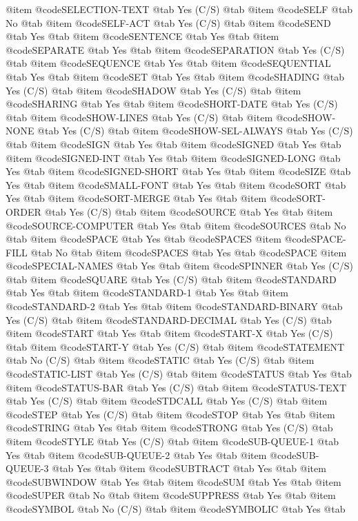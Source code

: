 @item @code{SELECTION-TEXT} @tab Yes	(C/S) @tab 
@item @code{SELF} @tab No @tab 
@item @code{SELF-ACT} @tab Yes	(C/S) @tab 
@item @code{SEND} @tab Yes @tab 
@item @code{SENTENCE} @tab Yes @tab 
@item @code{SEPARATE} @tab Yes @tab 
@item @code{SEPARATION} @tab Yes	(C/S) @tab 
@item @code{SEQUENCE} @tab Yes @tab 
@item @code{SEQUENTIAL} @tab Yes @tab 
@item @code{SET} @tab Yes @tab 
@item @code{SHADING} @tab Yes	(C/S) @tab 
@item @code{SHADOW} @tab Yes	(C/S) @tab 
@item @code{SHARING} @tab Yes @tab 
@item @code{SHORT-DATE} @tab Yes	(C/S) @tab 
@item @code{SHOW-LINES} @tab Yes	(C/S) @tab 
@item @code{SHOW-NONE} @tab Yes	(C/S) @tab 
@item @code{SHOW-SEL-ALWAYS} @tab Yes	(C/S) @tab 
@item @code{SIGN} @tab Yes @tab 
@item @code{SIGNED} @tab Yes @tab 
@item @code{SIGNED-INT} @tab Yes @tab 
@item @code{SIGNED-LONG} @tab Yes @tab 
@item @code{SIGNED-SHORT} @tab Yes @tab 
@item @code{SIZE} @tab Yes @tab 
@item @code{SMALL-FONT} @tab Yes @tab 
@item @code{SORT} @tab Yes @tab 
@item @code{SORT-MERGE} @tab Yes @tab 
@item @code{SORT-ORDER} @tab Yes	(C/S) @tab 
@item @code{SOURCE} @tab Yes @tab 
@item @code{SOURCE-COMPUTER} @tab Yes @tab 
@item @code{SOURCES} @tab No @tab 
@item @code{SPACE} @tab Yes @tab @code{SPACES}
@item @code{SPACE-FILL} @tab No @tab 
@item @code{SPACES} @tab Yes @tab @code{SPACE}
@item @code{SPECIAL-NAMES} @tab Yes @tab 
@item @code{SPINNER} @tab Yes	(C/S) @tab 
@item @code{SQUARE} @tab Yes	(C/S) @tab 
@item @code{STANDARD} @tab Yes @tab 
@item @code{STANDARD-1} @tab Yes @tab 
@item @code{STANDARD-2} @tab Yes @tab 
@item @code{STANDARD-BINARY} @tab Yes	(C/S) @tab 
@item @code{STANDARD-DECIMAL} @tab Yes	(C/S) @tab 
@item @code{START} @tab Yes @tab 
@item @code{START-X} @tab Yes	(C/S) @tab 
@item @code{START-Y} @tab Yes	(C/S) @tab 
@item @code{STATEMENT} @tab No	(C/S) @tab 
@item @code{STATIC} @tab Yes	(C/S) @tab 
@item @code{STATIC-LIST} @tab Yes	(C/S) @tab 
@item @code{STATUS} @tab Yes @tab 
@item @code{STATUS-BAR} @tab Yes	(C/S) @tab 
@item @code{STATUS-TEXT} @tab Yes	(C/S) @tab 
@item @code{STDCALL} @tab Yes	(C/S) @tab 
@item @code{STEP} @tab Yes	(C/S) @tab 
@item @code{STOP} @tab Yes @tab 
@item @code{STRING} @tab Yes @tab 
@item @code{STRONG} @tab Yes	(C/S) @tab 
@item @code{STYLE} @tab Yes	(C/S) @tab 
@item @code{SUB-QUEUE-1} @tab Yes @tab 
@item @code{SUB-QUEUE-2} @tab Yes @tab 
@item @code{SUB-QUEUE-3} @tab Yes @tab 
@item @code{SUBTRACT} @tab Yes @tab 
@item @code{SUBWINDOW} @tab Yes @tab 
@item @code{SUM} @tab Yes @tab 
@item @code{SUPER} @tab No @tab 
@item @code{SUPPRESS} @tab Yes @tab 
@item @code{SYMBOL} @tab No	(C/S) @tab 
@item @code{SYMBOLIC} @tab Yes @tab 
